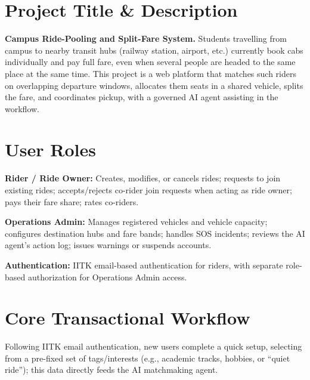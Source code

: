 \documentclass[10pt]{extarticle}
\begin{document}

\section{Project Title \& Description}
\textbf{Campus Ride-Pooling and Split-Fare System.}
Students travelling from campus to nearby transit hubs (railway station,
airport, etc.) currently book cabs individually and pay full fare, even
when several people are headed to the same place at the same time. This
project is a web platform that matches such riders on overlapping
departure windows, allocates them seats in a shared vehicle, splits the
fare, and coordinates pickup, with a governed AI agent assisting in the
workflow.

\section{User Roles}

\textbf{Rider / Ride Owner:} Creates, modifies, or cancels rides;
requests to join existing rides; accepts/rejects co-rider join requests
when acting as ride owner; pays their fare share; rates co-riders.

\textbf{Operations Admin:} Manages registered vehicles and vehicle
capacity; configures destination hubs and fare bands; handles SOS
incidents; reviews the AI agent's action log; issues warnings or
suspends accounts.

\textbf{Authentication:} IITK email-based authentication for riders,
with separate role-based authorization for Operations Admin access.

\section{Core Transactional Workflow}
Following IITK email authentication, new users complete a quick setup,
selecting from a pre-fixed set of tags/interests (e.g., academic
tracks, hobbies, or ``quiet ride''); this data directly feeds the AI
matchmaking agent.
\end{document}
